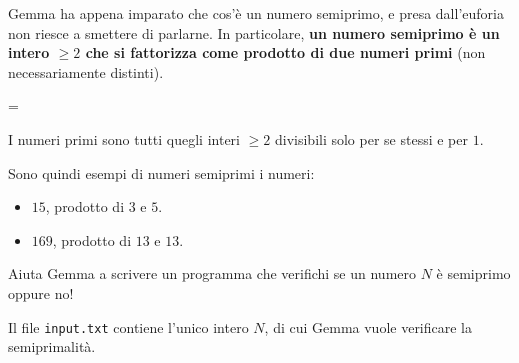 \usepackage{xcolor}
\usepackage{afterpage}
\usepackage{pifont,mdframed}
\usepackage[bottom]{footmisc}
\usepackage{amsthm}

\newcommand{\inputfile}{\texttt{input.txt}}
\newcommand{\outputfile}{\texttt{output.txt}}

\newenvironment{warning}
  {\par\begin{mdframed}[linewidth=2pt,linecolor=gray]%
    \begin{list}{}{\leftmargin=1cm
                   \labelwidth=\leftmargin}\item[\Large\ding{43}]}
  {\end{list}\end{mdframed}\par}


	{
	\vspace{-.95cm}\hfill{}
	}
	\vspace{.5cm}

	Gemma ha appena imparato che cos'è un numero semiprimo, e presa dall'euforia non riesce a smettere di parlarne. In particolare, \textbf{un numero semiprimo è un intero $\ge 2$ che si fattorizza come prodotto di due numeri primi} (non necessariamente distinti).

\begin{warning}
	I numeri primi sono tutti quegli interi $\ge 2$ divisibili solo per se stessi e per $1$. 
\end{warning}

	Sono quindi esempi di numeri semiprimi i numeri:
	\begin{itemize}[nolistsep, itemsep=2mm]
		\item $15$, prodotto di $3$ e $5$.
		\item $169$, prodotto di $13$ e $13$.
	\end{itemize}

	Aiuta Gemma a scrivere un programma che verifichi se un numero $N$ è semiprimo oppure no!


	\InputFile
	Il file \inputfile{} contiene l'unico intero $N$, di cui Gemma vuole verificare la semiprimalità.


